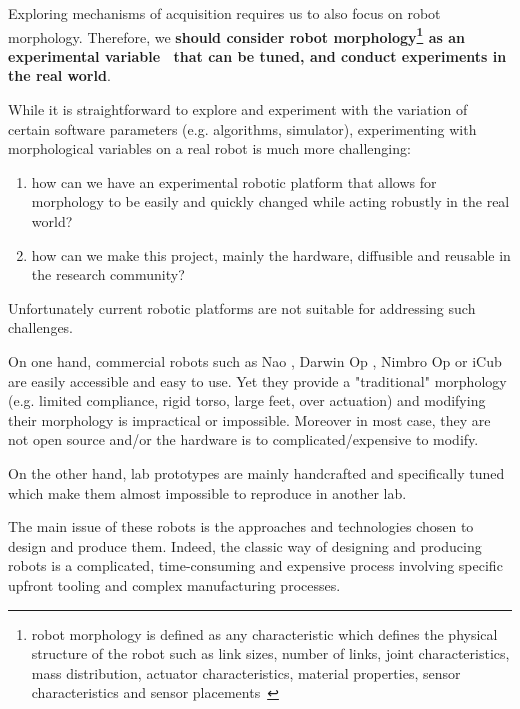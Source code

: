 
Exploring mechanisms of acquisition requires us to also focus on robot morphology. Therefore, we \textbf{should consider robot morphology\footnote{ robot morphology is defined as any characteristic which defines the physical structure of the robot such as link sizes, number of links, joint characteristics, mass distribution, actuator characteristics, material properties, sensor characteristics and sensor placements~\cite{paul2006morphological}} as an experimental variable~\cite{kaplan2008corps} that can be tuned, and conduct experiments in the real world}.

While it is straightforward to explore and experiment with the variation of certain software parameters (e.g. algorithms, simulator), experimenting with morphological variables on a real robot is much more challenging:

\begin{enumerate}
    \item how can we have an experimental robotic platform that allows for morphology to be easily and quickly changed  while acting robustly in the real world?
    \item how can we make this project, mainly the hardware, diffusible and reusable in the research community?
\end{enumerate}

Unfortunately current robotic platforms are not suitable for addressing such challenges.

On one hand, commercial robots such as Nao \cite{gouaillier2008nao}, Darwin Op \cite{ha2011development}, Nimbro Op \cite{schwarznimbro} or iCub \cite{metta2008icub} are easily accessible and easy to use. Yet they provide a "traditional" morphology (e.g. limited compliance, rigid torso, large feet, over actuation) and modifying their morphology is impractical or impossible. Moreover in most case, they are not open source and/or the hardware is to complicated/expensive to modify.

On the other hand, lab prototypes are mainly handcrafted and specifically tuned which make them almost impossible to reproduce in another lab.

The main issue of these robots is the approaches and technologies chosen to design and produce them. Indeed, the classic way of designing and producing robots is a complicated, time-consuming and expensive process involving specific upfront tooling and complex manufacturing processes.


